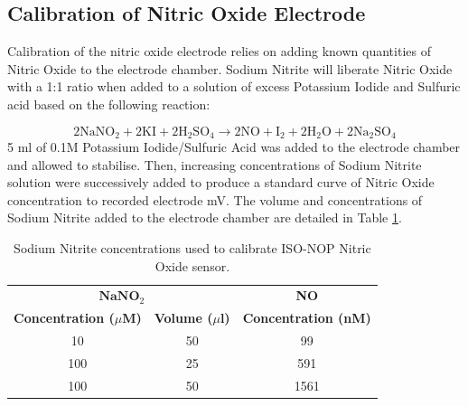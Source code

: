 \subsection{Calibration of Nitric Oxide Electrode}
Calibration of the nitric oxide electrode relies on adding known quantities of Nitric Oxide to the electrode chamber. Sodium Nitrite will liberate Nitric Oxide with a 1:1 ratio when added to a solution of excess Potassium Iodide and Sulfuric acid based on the following reaction:

\begin{equation}
2\mathrm{NaNO}_2 + 2\mathrm{KI} + 2 \mathrm{H}_2\mathrm{SO}_4 \longrightarrow 2\mathrm{NO} + \mathrm{I}_2 + 2\mathrm{H}_2\mathrm{O} + 2\mathrm{Na}_2\mathrm{SO}_4
\end{equation}
5 ml of 0.1M Potassium Iodide/Sulfuric Acid was added to the electrode chamber and allowed to stabilise. Then, increasing concentrations of Sodium Nitrite solution were successively added to produce a standard curve of Nitric Oxide concentration to recorded electrode mV. The volume and concentrations of Sodium Nitrite added to the electrode chamber are detailed in Table \ref{tab:sodiumnitrite}.

\begin{table}[here]
\begin{center}
\begin{tabular}{ccc}
\toprule
\multicolumn{2}{c}{$\mathbf{NaNO}_2$} & \textbf{NO} \\
\textbf{Concentration ($\mu$M)} & \textbf{Volume ($\mu$l)} & \textbf{Concentration (nM)} \\
\midrule
10 & 50 & 99 \\
100 & 25 & 591 \\
100 & 50 & 1561 \\
\bottomrule
\end{tabular} 
\end{center}
\caption{Sodium Nitrite concentrations used to calibrate ISO-NOP Nitric Oxide sensor.
\label{tab:sodiumnitrite}}
\end{table}

